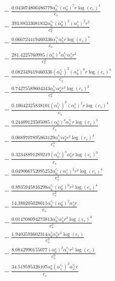 \documentclass[10pt]{article}
\begin{document}
\begin{align*}
&{}  - \frac{0.043074806486779 \alpha_{0}^{c_s} \left(\alpha_{0}^s\right)^{7} r \log{\left(c_{s} \right)}^{4}}{c_{s}} \\
&{}  - \frac{393.88333081832 \alpha_{0}^{c_s} \left(\alpha_{0}^s\right)^{2} \left(\alpha_{1}^s\right)^{2} r^{2}}{c_{s}^{2}} \\
&{}  - \frac{0.066724419460336 \alpha_{1}^{c_s} \alpha_{5}^s r \log{\left(c_{s} \right)}^{4}}{c_{s}} \\
&{}  - \frac{281.4225760985 \left(\alpha_{0}^s\right)^{3} \alpha_{1}^{c_s} \alpha_{1}^s r^{2}}{c_{s}^{2}} \\
&{}  - \frac{0.082349419460336 \left(\alpha_{0}^{c_s}\right)^{2} \left(\alpha_{0}^s\right)^{6} r \log{\left(c_{s} \right)}^{4}}{c_{s}} \\
&{}  - \frac{0.74275589604343 \alpha_{0}^{c_s} \alpha_{4}^s r^{3} \log{\left(c_{s} \right)}^{2}}{c_{s}^{3}} \\
&{}  - \frac{0.10642325838101 \left(\alpha_{1}^{c_s}\right)^{2} \left(\alpha_{1}^s\right)^{2} r \log{\left(c_{s} \right)}^{4}}{c_{s}} \\
&{}  - \frac{0.24409123505085 \left(\alpha_{0}^s\right)^{4} \alpha_{3}^{c_s} r \log{\left(c_{s} \right)}^{3}}{c_{s}} \\
&{}  - \frac{0.0089707895863129 \alpha_{1}^{c_s} \alpha_{3}^s r^{3} \log{\left(c_{s} \right)}^{4}}{c_{s}^{3}} \\
&{}  - \frac{0.32348891289219 \left(\alpha_{0}^{c_s}\right)^{4} \alpha_{3}^s r \log{\left(c_{s} \right)}^{3}}{c_{s}} \\
&{}  - \frac{0.049066752095252 \alpha_{0}^{c_s} \left(\alpha_{1}^s\right)^{2} r^{4} \log{\left(c_{s} \right)}^{4}}{c_{s}^{4}} \\
&{}  - \frac{0.8935945816298 \alpha_{0}^{c_s} \left(\alpha_{0}^s\right)^{6} r^{2} \log{\left(c_{s} \right)}^{4}}{c_{s}^{2}} \\
&{}  - \frac{14.380205028011 \alpha_{0}^{c_s} \left(\alpha_{0}^s\right)^{2} \alpha_{4}^s r}{c_{s}} \\
&{}  - \frac{0.014708094273813 \alpha_{0}^{c_s} \alpha_{4}^s r^{3} \log{\left(c_{s} \right)}^{4}}{c_{s}^{3}} \\
&{}  - \frac{1.9403593602314 \alpha_{0}^s \alpha_{3}^s r^{4} \log{\left(c_{s} \right)}}{c_{s}^{4}} \\
&{}  - \frac{8.0842990155077 \left(\alpha_{0}^s\right)^{2} \alpha_{1}^{c_s} r^{5} \log{\left(c_{s} \right)}}{c_{s}^{5}} \\
&{}  - \frac{34.519595326107 \alpha_{0}^s \left(\alpha_{1}^{c_s}\right)^{2} \alpha_{2}^{c_s} r}{c_{s}} \\

\end{align*}
\end{document}

